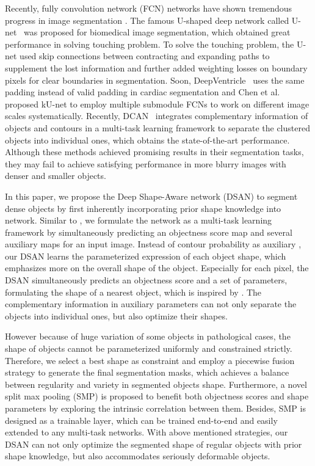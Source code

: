 Recently, fully convolution network (FCN) networks have shown tremendous progress in image segmentation \cite{Long2015a,Chen2016d,Dai2015,Zheng2015}.
The famous U-shaped deep network called U-net~\cite{Ronneberger2015} was proposed for biomedical image segmentation, which obtained great performance in solving touching problem.
To solve the touching problem, the U-net used skip connections between contracting and expanding paths to supplement the lost information and further added weighting losses on boundary pixels for clear boundaries in segmentation.
Soon, DeepVentricle~\cite{Lieman-Sifry2017} uses the same padding instead of valid padding in cardiac segmentation and Chen et al. \cite{Chen2016c} proposed kU-net to employ multiple submodule FCNs to work on different image scales systematically.
Recently, DCAN~\cite{Chen2017} integrates complementary information of objects and contours in a multi-task learning framework to separate the clustered objects into individual ones, which obtains the state-of-the-art performance.
Although these methods achieved promising results in their segmentation tasks, they may fail to achieve satisfying performance in more blurry images with denser and smaller objects.

In this paper, we propose the Deep Shape-Aware network (DSAN) to segment dense objects by first inherently incorporating prior shape knowledge into network.
Similar to \cite{Chen2017,Ren2015,Li2016a,Chen2016,Bertasius2016}, we formulate the network as a multi-task learning framework by simultaneously predicting an objectness score map and several auxiliary maps for an input image.
Instead of contour probability as auxiliary \cite{Chen2017,Chen2016,Bertasius2016}, our DSAN learns the parameterized expression of each object shape, which emphasizes more on the overall shape of the object.
Especially for each pixel, the DSAN simultaneously predicts an objectness score and a set of parameters, formulating the shape of a nearest object, which is inspired by \cite{Ren2015} .
The complementary information in auxiliary parameters can not only separate the objects into individual ones, but also optimize their shapes.

However because of huge variation of some objects in pathological cases, the shape of objects cannot be parameterized uniformly and constrained strictly.
Therefore, we select a best shape as constraint and employ a piecewise fusion strategy to generate the final segmentation masks, which achieves a balance between regularity and variety in segmented objects shape.
Furthermore, a novel split max pooling (SMP) is proposed to benefit both objectness scores and shape parameters by exploring the intrinsic correlation between them.
Besides, SMP is designed as a trainable layer, which can be trained end-to-end and easily extended to any multi-task networks.
With above mentioned strategies, our DSAN can not only optimize the segmented shape of regular objects with prior shape knowledge, but also accommodates seriously deformable objects.

